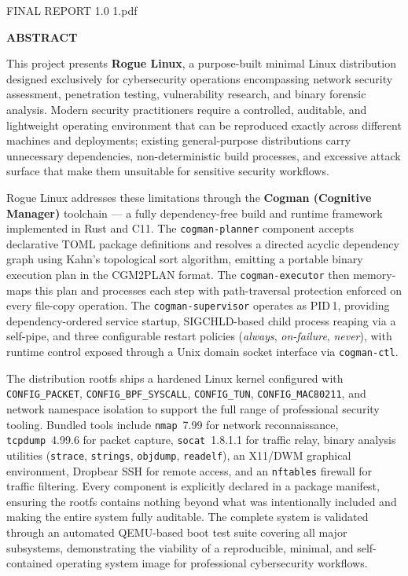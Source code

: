 \documentclass[12pt,a4paper]{report}
\newcommand{\uchapter}[1]{%
  \clearpage
  \begin{center}{\large\bfseries\MakeUppercase{#1}}\end{center}
  \vspace{6pt}
  \addcontentsline{toc}{chapter}{#1}}
\begin{document}
%
  {FINAL REPORT 1.0 1.pdf}

\uchapter{Abstract}

This project presents \textbf{Rogue Linux}, a purpose-built minimal Linux
distribution designed exclusively for cybersecurity operations encompassing
network security assessment, penetration testing, vulnerability research, and
binary forensic analysis. Modern security practitioners require a controlled,
auditable, and lightweight operating environment that can be reproduced exactly
across different machines and deployments; existing general-purpose distributions
carry unnecessary dependencies, non-deterministic build processes, and excessive
attack surface that make them unsuitable for sensitive security workflows.

Rogue Linux addresses these limitations through the \textbf{Cogman (Cognitive
Manager)} toolchain --- a fully dependency-free build and runtime framework
implemented in Rust and C11. The \texttt{cogman-planner} component accepts
declarative TOML package definitions and resolves a directed acyclic dependency
graph using Kahn's topological sort algorithm, emitting a portable binary
execution plan in the CGM2PLAN format. The \texttt{cogman-executor} then
memory-maps this plan and processes each step with path-traversal protection
enforced on every file-copy operation. The \texttt{cogman-supervisor} operates
as PID\,1, providing dependency-ordered service startup, SIGCHLD-based child
process reaping via a self-pipe, and three configurable restart policies
(\textit{always}, \textit{on-failure}, \textit{never}), with runtime control
exposed through a Unix domain socket interface via \texttt{cogman-ctl}.

The distribution rootfs ships a hardened Linux kernel configured with
\texttt{CONFIG\_PACKET}, \texttt{CONFIG\_BPF\_SYSCALL}, \texttt{CONFIG\_TUN},
\texttt{CONFIG\_MAC80211}, and network namespace isolation to support the full
range of professional security tooling. Bundled tools include \texttt{nmap}~7.99
for network reconnaissance, \texttt{tcpdump}~4.99.6 for packet capture,
\texttt{socat}~1.8.1.1 for traffic relay, binary analysis utilities
(\texttt{strace}, \texttt{strings}, \texttt{objdump}, \texttt{readelf}), an
X11/DWM graphical environment, Dropbear SSH for remote access, and an
\texttt{nftables} firewall for traffic filtering. Every component is explicitly
declared in a package manifest, ensuring the rootfs contains nothing beyond
what was intentionally included and making the entire system fully auditable.
The complete system is validated through an automated QEMU-based boot test
suite covering all major subsystems, demonstrating the viability of a
reproducible, minimal, and self-contained operating system image for
professional cybersecurity workflows.
\end{document}
